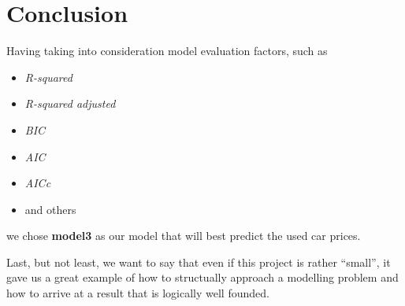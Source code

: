 \section{Conclusion} %
\label{sec:conclusion}

Having taking into consideration model evaluation factors, such as 
\begin{itemize}
	\item \emph{R-squared}
	\item \emph{R-squared adjusted}
	\item \emph{BIC}
	\item \emph{AIC}
	\item \emph{AICc}
	\item and others
\end{itemize}

we chose \textbf{model3} as our model that will best predict the 
used car prices. 

\hfill

Last, but not least, we want to say that even if this project is rather 
``small'', it gave us a great example of how to structually approach a 
modelling problem and how to arrive at a result that is logically well 
founded. 

